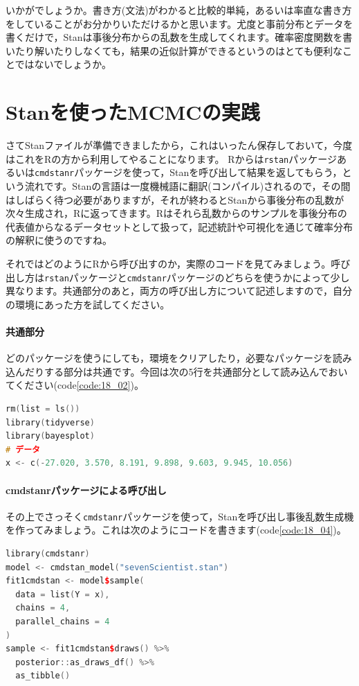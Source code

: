 \documentclass{ltjsbook}
\begin{document}
いかがでしょうか。書き方(文法)がわかると比較的単純，あるいは率直な書き方をしていることがお分かりいただけるかと思います。尤度と事前分布とデータを書くだけで，Stanは事後分布からの乱数を生成してくれます。確率密度関数を書いたり解いたりしなくても，結果の近似計算ができるというのはとても便利なことではないでしょうか。
\section{Stanを使ったMCMCの実践}
さてStanファイルが準備できましたから，これはいったん保存しておいて，今度はこれをRの方から利用してやることになります。
Rからは\texttt{rstan}パッケージあるいは\texttt{cmdstanr}パッケージを使って，Stanを呼び出して結果を返してもらう，という流れです。Stanの言語は一度機械語に翻訳(コンパイル)されるので，その間はしばらく待つ必要がありますが，それが終わるとStanから事後分布の乱数が次々生成され，Rに返ってきます。Rはそれら乱数からのサンプルを事後分布の代表値からなるデータセットとして扱って，記述統計や可視化を通じて確率分布の解釈に使うのですね。

それではどのようにRから呼び出すのか，実際のコードを見てみましょう。呼び出し方は\texttt{rstan}パッケージと\texttt{cmdstanr}パッケージのどちらを使うかによって少し異なります。共通部分のあと，両方の呼び出し方について記述しますので，自分の環境にあった方を試してください。
\paragraph{共通部分}
どのパッケージを使うにしても，環境をクリアしたり，必要なパッケージを読み込んだりする部分は共通です。今回は次の5行を共通部分として読み込んでおいてください(code\ref{code:18_02})。

\begin{lstlisting}[language=C++,label={code:18_02},caption={環境の準備と共通部分}]
rm(list = ls())
library(tidyverse)
library(bayesplot)
# データ
x <- c(-27.020, 3.570, 8.191, 9.898, 9.603, 9.945, 10.056)
\end{lstlisting}

\paragraph{cmdstanrパッケージによる呼び出し}

その上でさっそく\texttt{cmdstanr}パッケージを使って，Stanを呼び出し事後乱数生成機を作ってみましょう。これは次のようにコードを書きます(code\ref{code:18_04})。

\begin{lstlisting}[language=C++,label={code:18_04},caption={cmdstanrパッケージによる呼び出し}]
library(cmdstanr)
model <- cmdstan_model("sevenScientist.stan")
fit1cmdstan <- model$sample(
  data = list(Y = x),
  chains = 4,
  parallel_chains = 4
)
sample <- fit1cmdstan$draws() %>% 
  posterior::as_draws_df() %>% 
  as_tibble()
\end{lstlisting}
\end{document}
